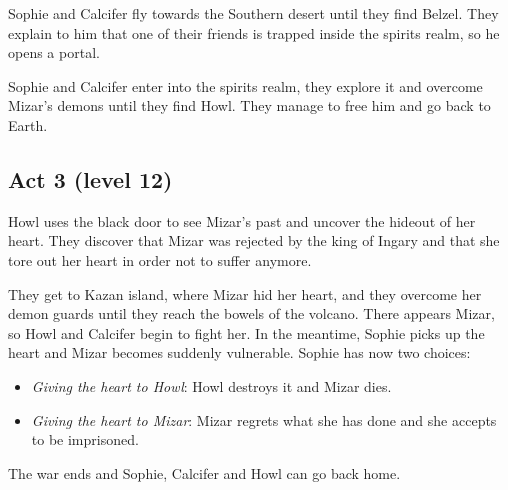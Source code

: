 Sophie and Calcifer fly towards the Southern desert until they find Belzel. They explain to him that one of their friends is trapped inside the spirits realm, so he opens a portal.

Sophie and Calcifer enter into the spirits realm, they explore it and overcome Mizar's demons until they find Howl. They manage to free him and go back to Earth.

\subsection*{Act 3 (level 12)}
Howl uses the black door to see Mizar's past and uncover the hideout of her heart. They discover that Mizar was rejected by the king of Ingary and that she tore out her heart in order not to suffer anymore.

They get to Kazan island, where Mizar hid her heart, and they overcome her demon guards until they reach the bowels of the volcano. There appears Mizar, so Howl and Calcifer begin to fight her. In the meantime, Sophie picks up the heart and Mizar becomes suddenly vulnerable. Sophie has now two choices:
\begin{itemize}
\item \textit{Giving the heart to Howl}: Howl destroys it and Mizar dies.
\item \textit{Giving the heart to Mizar}: Mizar regrets what she has done and she accepts to be imprisoned.
\end{itemize} 

The war ends and Sophie, Calcifer and Howl can go back home.